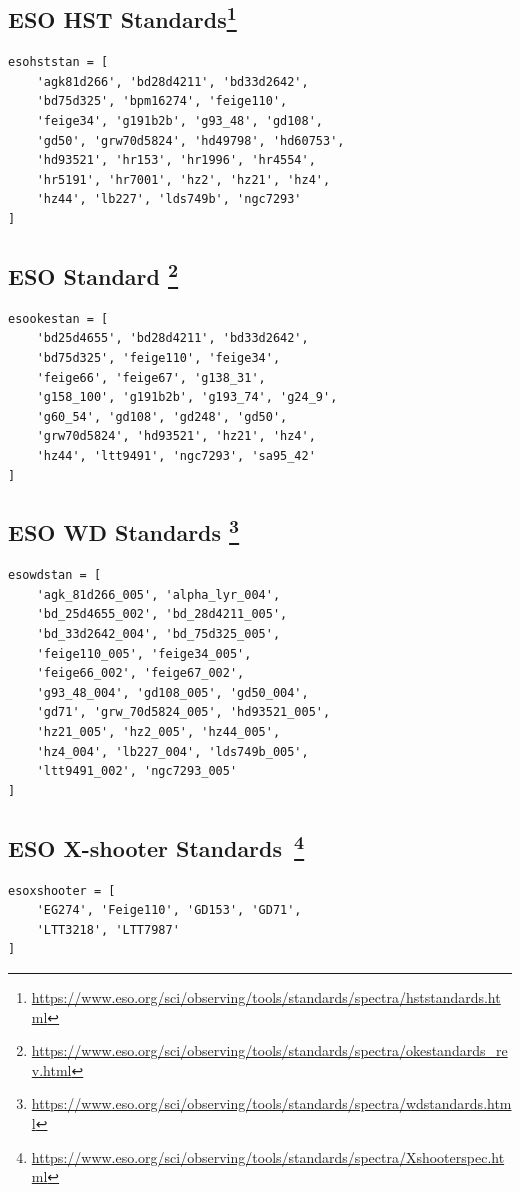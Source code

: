 \documentclass[fleqn,usenatbib]{mnras}
\begin{document}
\subsection*{ESO \citet{1995AJ....110.1316B, 1996AJ....111.1743B} HST Standards\footnote{\url{https://www.eso.org/sci/observing/tools/standards/spectra/hststandards.html}}}
\begin{verbatim}
esohststan = [
    'agk81d266', 'bd28d4211', 'bd33d2642',
    'bd75d325', 'bpm16274', 'feige110',
    'feige34', 'g191b2b', 'g93_48', 'gd108',
    'gd50', 'grw70d5824', 'hd49798', 'hd60753',
    'hd93521', 'hr153', 'hr1996', 'hr4554',
    'hr5191', 'hr7001', 'hz2', 'hz21', 'hz4',
    'hz44', 'lb227', 'lds749b', 'ngc7293'
]
\end{verbatim}

\subsection*{ESO \citet{1990AJ.....99.1621O} Standard \footnote{\url{https://www.eso.org/sci/observing/tools/standards/spectra/okestandards_rev.html}}}

\begin{verbatim}
esookestan = [
    'bd25d4655', 'bd28d4211', 'bd33d2642',
    'bd75d325', 'feige110', 'feige34',
    'feige66', 'feige67', 'g138_31',
    'g158_100', 'g191b2b', 'g193_74', 'g24_9',
    'g60_54', 'gd108', 'gd248', 'gd50',
    'grw70d5824', 'hd93521', 'hz21', 'hz4',
    'hz44', 'ltt9491', 'ngc7293', 'sa95_42'
]
\end{verbatim}

\subsection*{ESO \citet{1995AJ....110.1316B} WD Standards \footnote{\url{https://www.eso.org/sci/observing/tools/standards/spectra/wdstandards.html}}}
\begin{verbatim}
esowdstan = [
    'agk_81d266_005', 'alpha_lyr_004',
    'bd_25d4655_002', 'bd_28d4211_005',
    'bd_33d2642_004', 'bd_75d325_005',
    'feige110_005', 'feige34_005',
    'feige66_002', 'feige67_002',
    'g93_48_004', 'gd108_005', 'gd50_004',
    'gd71', 'grw_70d5824_005', 'hd93521_005',
    'hz21_005', 'hz2_005', 'hz44_005',
    'hz4_004', 'lb227_004', 'lds749b_005',
    'ltt9491_002', 'ngc7293_005'
]
\end{verbatim}

\subsection*{ESO X-shooter Standards~\citep{2014Msngr.158...16M, 2014A&A...568A...9M}\footnote{\url{https://www.eso.org/sci/observing/tools/standards/spectra/Xshooterspec.html}}}
\begin{verbatim}
esoxshooter = [
    'EG274', 'Feige110', 'GD153', 'GD71',
    'LTT3218', 'LTT7987'
]
\end{verbatim}
\end{document}
